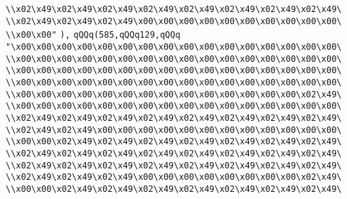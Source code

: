 \verb|\\x02\x49\x02\x49\x02\x49\x02\x49\x02\x49\x02\x49\x02\x49\x02\x49\|\newline
\verb|\\x02\x49\x02\x49\x02\x49\x00\x00\x00\x00\x00\x00\x00\x00\x00\x00\|\newline
\verb|\\x00\x00"|\newline
\verb|),|\newline
\verb|qQQq(585,qQQq129,qQQq|\newline
\verb|"\x00\x00\x00\x00\x00\x00\x00\x00\x00\x00\x00\x00\x00\x00\x00\x00\|\newline
\verb|\\x00\x00\x00\x00\x00\x00\x00\x00\x00\x00\x00\x00\x00\x00\x00\x00\|\newline
\verb|\\x00\x00\x00\x00\x00\x00\x00\x00\x00\x00\x00\x00\x00\x00\x00\x00\|\newline
\verb|\\x00\x00\x00\x00\x00\x00\x00\x00\x00\x00\x00\x00\x00\x00\x00\x00\|\newline
\verb|\\x00\x00\x00\x00\x00\x00\x00\x00\x00\x00\x00\x00\x00\x00\x02\x49\|\newline
\verb|\\x00\x00\x00\x00\x00\x00\x00\x00\x00\x00\x00\x00\x00\x00\x00\x00\|\newline
\verb|\\x02\x49\x02\x49\x02\x49\x02\x49\x02\x49\x02\x49\x02\x49\x02\x49\|\newline
\verb|\\x02\x49\x02\x49\x00\x00\x00\x00\x00\x00\x00\x00\x00\x00\x00\x00\|\newline
\verb|\\x00\x00\x02\x49\x02\x49\x02\x49\x02\x49\x02\x49\x02\x49\x02\x49\|\newline
\verb|\\x02\x49\x02\x49\x02\x49\x02\x49\x02\x49\x02\x49\x02\x49\x02\x49\|\newline
\verb|\\x02\x49\x02\x49\x02\x49\x02\x49\x02\x49\x02\x49\x02\x49\x02\x49\|\newline
\verb|\\x02\x49\x02\x49\x02\x49\x00\x00\x00\x00\x00\x00\x00\x00\x02\x49\|\newline
\verb|\\x00\x00\x02\x49\x02\x49\x02\x49\x02\x49\x02\x49\x02\x49\x02\x49\|\newline
